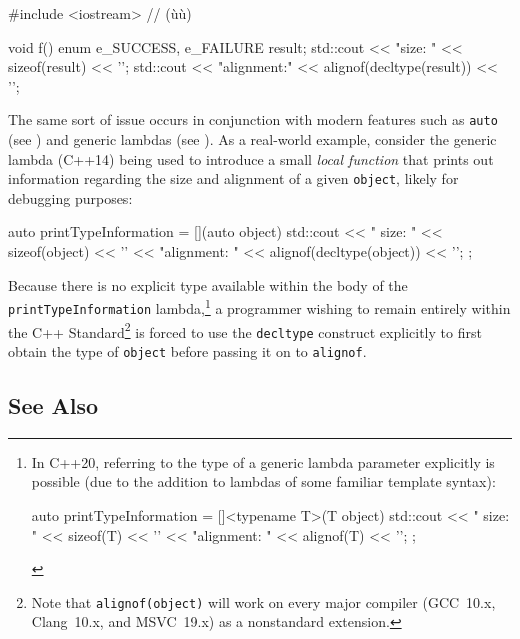 \begin{emcppshiddenlisting}[emcppsbatch={e4,e5,e6}]
#include <iostream>  // (ù{}ù)
\end{emcppshiddenlisting}
\begin{emcppslisting}[emcppsbatch=e4]
void f()
{
    enum { e_SUCCESS, e_FAILURE } result;
    std::cout << "size: " << sizeof(result) << '\n';
    std::cout << "alignment:" << alignof(decltype(result)) << '\n';
}
\end{emcppslisting}
    
\noindent The same sort of issue occurs in conjunction with modern  features such as \lstinline!auto! (see ) and
generic lambdas (see ). As a real-world example, consider the
generic lambda (C++14) being used to introduce a small
\emph{local function} that prints out information regarding the size and
alignment of a given \lstinline!object!, likely for debugging purposes:

\begin{emcppslisting}[emcppsbatch=e5,emcppsstandards={c++14}]
auto printTypeInformation = [](auto object)
{
    std::cout << "     size: " << sizeof(object) << '\n'
              << "alignment: " << alignof(decltype(object)) << '\n';
};
\end{emcppslisting}
    
\noindent Because there is no explicit type available within the body of the
\lstinline!printTypeInformation! lambda,{\cprotect\footnote{In C++20, referring to the type of a generic lambda parameter explicitly is possible (due to the addition to lambdas of some familiar template syntax):

\begin{emcppslisting}[emcppsbatch=e6,style=footcode,emcppsstandards={c++20}]
auto printTypeInformation = []<typename T>(T object)
{
    std::cout << "     size: " << sizeof(T) << '\n'
              << "alignment: " << alignof(T) << '\n';
};
\end{emcppslisting}
      }} a programmer wishing to remain entirely within the C++
Standard{\cprotect\footnote{Note that \lstinline!alignof(object)! will work
on every major compiler (GCC~10.x, Clang~10.x, and MSVC~19.x) as a
  nonstandard extension.}} is forced to use the
\lstinline!decltype! construct explicitly to first obtain
the type of \lstinline!object! before passing it on to \lstinline!alignof!.

\subsection[See Also]{See Also}\label{see-also}

